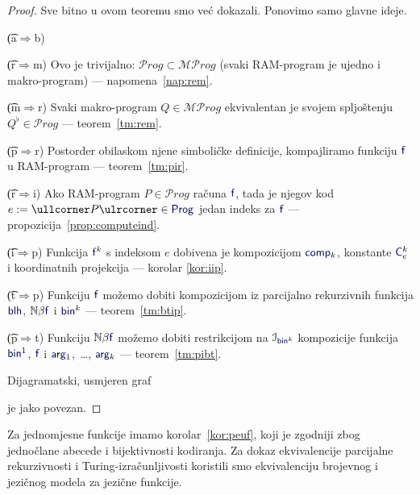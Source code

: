 \begin{proof}
Sve bitno u ovom teoremu smo već dokazali. Ponovimo samo glavne ideje.

\begin{labeling}{\t{(a$\Rightarrow$b)}}
    \item[\t{(r$\Rightarrow$m)}] Ovo je trivijalno: $\mathcal Prog\subset\mathcal{MP}rog$ (svaki RAM-program je ujedno i makro-program) --- napomena~\ref{nap:rem}.
    \item[\t{(m$\Rightarrow$r)}] Svaki makro-program $Q\in\mathcal{MP}rog$ ekvivalentan je svojem spljoštenju $Q^\flat\in\mathcal Prog$ --- teorem~\ref{tm:rem}.
    \item[\t{(p$\Rightarrow$r)}] Postorder obilaskom njene simboličke definicije, kompajliramo funkciju $\f f$ u RAM-program --- teorem~\ref{tm:pir}.
    \item[\t{(r$\Rightarrow$i)}] Ako RAM-program $P\in\mathcal Prog$ računa $\f f$, tada je njegov kod $e:=\kprog P\in\f{Prog}$ jedan indeks za $ \f f$ --- propozicija~\ref{prop:computeind}.
    \item[\t{(i$\Rightarrow$p)}] Funkcija $\f f^k$ s indeksom $e$ dobivena je kompozicijom $\f{comp}_k$, konstante $\f C_e^k$ i koordinatnih projekcija --- korolar \ref{kor:iip}.
    \item[\t{(t$\Rightarrow$p)}] Funkciju $\f f$ možemo dobiti kompozicijom iz parcijalno rekurzivnih funkcija $\f{blh}$, $\N\beta\f f$ i $\f{bin}^k$ --- teorem~\ref{tm:btip}.
    \item[\t{(p$\Rightarrow$t)}] Funkciju $\N\beta\f f$ možemo dobiti restrikcijom na $\im{\f{bin}^k}$ kompozicije funkcija $\f{bin}^1$, $\f f$ i $\f{arg}_1$,~\ldots, $\f{arg}_k$ --- teorem~\ref{tm:pibt}.
\end{labeling}
Dijagramatski, usmjeren graf
 je jako povezan.
\end{proof}

Za jednomjesne funkcije imamo korolar~\ref{kor:peuf}, koji je zgodniji zbog jednočlane abecede i bijektivnosti kodiranja. Za dokaz ekvivalencije parcijalne rekurzivnosti i Turing-izračunljivosti koristili smo ekvivalenciju brojevnog i jezičnog modela za jezične funkcije.

